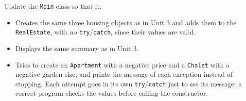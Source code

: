 Update the \texttt{Main} class so that it:

\begin{itemize}

    \item Creates the same three housing objects as in Unit 3 and adds them to the \texttt{RealEstate}, with no \texttt{try}/\texttt{catch}, since their values are valid.

    \item Displays the same summary as in Unit 3.

    \item Tries to create an \texttt{Apartment} with a negative price and a \texttt{Chalet} with a negative garden size, and prints the message of each exception instead of stopping. Each attempt goes in its own \texttt{try}/\texttt{catch} just to see its message: a correct program checks the values before calling the constructor.

\end{itemize}
